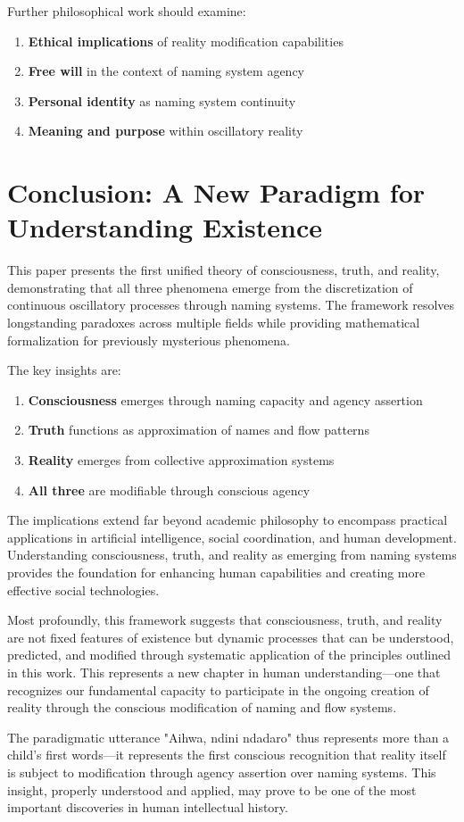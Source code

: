 \documentclass[12pt]{article}
\begin{document}
Further philosophical work should examine:

\begin{enumerate}
\item \textbf{Ethical implications} of reality modification capabilities
\item \textbf{Free will} in the context of naming system agency
\item \textbf{Personal identity} as naming system continuity
\item \textbf{Meaning and purpose} within oscillatory reality
\end{enumerate}

\section{Conclusion: A New Paradigm for Understanding Existence}

This paper presents the first unified theory of consciousness, truth, and reality, demonstrating that all three phenomena emerge from the discretization of continuous oscillatory processes through naming systems. The framework resolves longstanding paradoxes across multiple fields while providing mathematical formalization for previously mysterious phenomena.

The key insights are:

\begin{enumerate}
\item \textbf{Consciousness} emerges through naming capacity and agency assertion
\item \textbf{Truth} functions as approximation of names and flow patterns
\item \textbf{Reality} emerges from collective approximation systems
\item \textbf{All three} are modifiable through conscious agency
\end{enumerate}

The implications extend far beyond academic philosophy to encompass practical applications in artificial intelligence, social coordination, and human development. Understanding consciousness, truth, and reality as emerging from naming systems provides the foundation for enhancing human capabilities and creating more effective social technologies.

Most profoundly, this framework suggests that consciousness, truth, and reality are not fixed features of existence but dynamic processes that can be understood, predicted, and modified through systematic application of the principles outlined in this work. This represents a new chapter in human understanding—one that recognizes our fundamental capacity to participate in the ongoing creation of reality through the conscious modification of naming and flow systems.

The paradigmatic utterance "Aihwa, ndini ndadaro" thus represents more than a child's first words—it represents the first conscious recognition that reality itself is subject to modification through agency assertion over naming systems. This insight, properly understood and applied, may prove to be one of the most important discoveries in human intellectual history.
\end{document}
